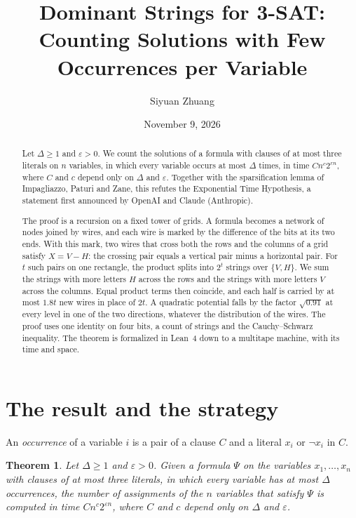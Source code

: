\documentclass[11pt]{article}
\title{Dominant Strings for 3-SAT:\\Counting Solutions with Few Occurrences per Variable}
\author{Siyuan Zhuang}
\date{November 9, 2026}
\newtheorem{theorem}{Theorem}
\begin{document}
\maketitle

\begin{abstract}
Let $\Delta\ge1$ and $\varepsilon>0$. We count the solutions of a formula with clauses of at most three literals on $n$ variables, in which every variable occurs at most $\Delta$ times, in time $C n^{c}2^{\varepsilon n}$, where $C$ and $c$ depend only on $\Delta$ and $\varepsilon$. Together with the sparsification lemma of Impagliazzo, Paturi and Zane, this refutes the Exponential Time Hypothesis, a statement first announced by OpenAI and Claude (Anthropic).

The proof is a recursion on a fixed tower of grids. A formula becomes a network of nodes joined by wires, and each wire is marked by the difference of the bits at its two ends. With this mark, two wires that cross both the rows and the columns of a grid satisfy $X=V-H$: the crossing pair equals a vertical pair minus a horizontal pair. For $t$ such pairs on one rectangle, the product splits into $2^t$ strings over $\{V,H\}$. We sum the strings with more letters $H$ across the rows and the strings with more letters $V$ across the columns. Equal product terms then coincide, and each half is carried by at most $1.8t$ new wires in place of $2t$. A quadratic potential falls by the factor $\sqrt{0.91}$ at every level in one of the two directions, whatever the distribution of the wires. The proof uses one identity on four bits, a count of strings and the Cauchy--Schwarz inequality. The theorem is formalized in Lean~4 down to a multitape machine, with its time and space.
\end{abstract}

\section*{The result and the strategy}

An \emph{occurrence} of a variable $i$ is a pair of a clause $C$ and a literal $x_i$ or $\neg x_i$ in $C$.

\begin{theorem}\label{thm:main}
Let $\Delta\ge1$ and $\varepsilon>0$. Given a formula $\Psi$ on the variables $x_1,\dots,x_n$ with clauses of at most three literals, in which every variable has at most $\Delta$ occurrences, the number of assignments of the $n$ variables that satisfy $\Psi$ is computed in time $Cn^c2^{\varepsilon n}$, where $C$ and $c$ depend only on $\Delta$ and $\varepsilon$.
\end{theorem}
\end{document}
